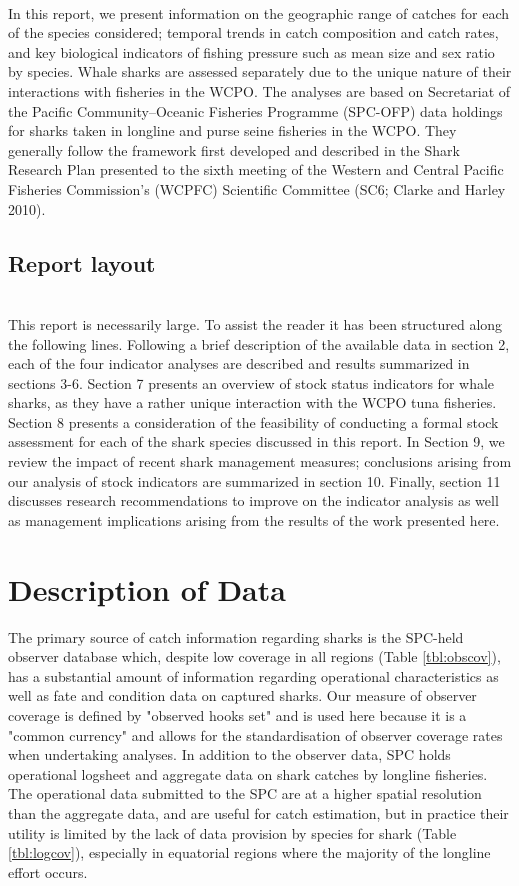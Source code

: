 \documentclass[12pt]{SCreport}
\begin{document}
\\
In this report, we present information on the geographic range of catches for each of the species considered; temporal trends in catch composition and catch rates, and key biological indicators of fishing pressure such as mean size and sex ratio by species. Whale sharks are assessed separately due to the unique nature of their interactions with fisheries in the WCPO. The analyses are based on Secretariat of the Pacific Community--Oceanic Fisheries Programme (SPC-OFP) data holdings for sharks taken in longline and purse seine fisheries in the WCPO.  They generally follow the framework first developed and described in the Shark Research Plan presented to the sixth meeting of the Western and Central Pacific Fisheries Commission's (WCPFC) Scientific Committee (SC6; Clarke and Harley 2010). 

\subsection{Report layout}
\\
This report is necessarily large. To assist the reader it has been structured along the following lines.
Following a brief description of the available data in section 2, each of the four indicator analyses
are described and results summarized in sections 3-6. Section 7 presents an overview of stock status indicators for whale sharks, as they have a rather unique interaction with the WCPO tuna fisheries. Section 8 presents a consideration of the
feasibility of conducting a formal stock assessment for each of the shark species discussed in this
report. In Section 9, we review the impact of recent shark management measures; conclusions arising from our analysis of stock indicators are summarized in section 10. Finally, section 11 discusses research recommendations to improve on the indicator analysis as well as management implications arising from the results of the work presented here.

\section{Description of Data}

The primary source of catch information regarding sharks is the SPC-held observer database which, despite low coverage in all regions (Table \ref{tbl:obscov}), has a substantial amount of information regarding operational characteristics as well as fate and condition data on captured sharks. Our measure of observer coverage is defined by "observed hooks set" and is used here because it is a "common currency" and allows for the standardisation of observer coverage rates when undertaking analyses.  In addition to the observer data, SPC holds operational logsheet and aggregate data on shark catches by longline fisheries. The operational data submitted to the SPC are at a higher spatial resolution than the aggregate data, and are useful for catch estimation, but in practice their utility is limited by the lack of data provision by species for shark (Table \ref{tbl:logcov}), especially in equatorial regions where the majority of the longline effort occurs. 
\end{document}
